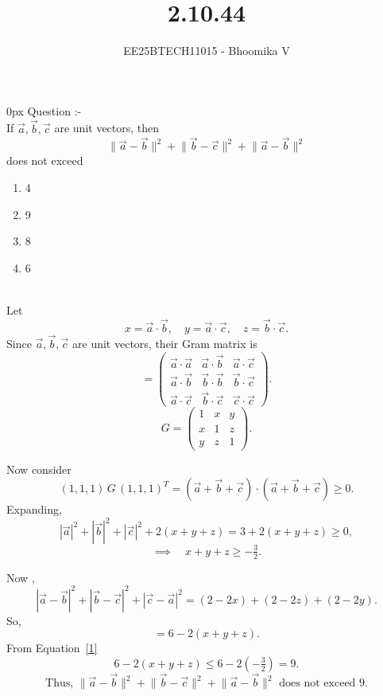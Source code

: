 \documentclass[journal]{IEEEtran}
\begin{document}

\vspace{3cm}

\title{2.10.44}
\author{EE25BTECH11015 - Bhoomika V}
{\let\newpage\relax\maketitle}

\renewcommand{\thefigure}{\theenumi}
\renewcommand{\thetable}{\theenumi}
\setlength{\intextsep}{10pt} %


\renewcommand{\thetable}{\theenumi}
\parindent 0px 
{Question :-} \\ 
If $\vec{a}, \vec{b}, \vec{c}$ are unit vectors, then
\[
\lVert \vec{a} - \vec{b} \rVert^2
+ \lVert \vec{b} - \vec{c} \rVert^2
+ \lVert \vec{a} - \vec{b} \rVert^2
\]
does not exceed
\begin{enumerate}[label=\alph*)] %
    \item 4
    \item 9
    \item 8
    \item 6
\end{enumerate}




\solution \\
Let 
\[
x = \vec{a}\cdot \vec{b}, \quad y = \vec{a}\cdot \vec{c}, \quad z = \vec{b}\cdot \vec{c}.
\]
Since $\vec{a},\vec{b},\vec{c}$ are unit vectors, their Gram matrix is
\[
 = \begin{pmatrix}
\vec{a}\cdot \vec{a} & \vec{a}\cdot \vec{b} & \vec{a}\cdot \vec{c} \\
\vec{a}\cdot \vec{b} & \vec{b}\cdot \vec{b} & \vec{b}\cdot \vec{c} \\
\vec{a}\cdot \vec{c} & \vec{b}\cdot \vec{c} & \vec{c}\cdot \vec{c}
\end{pmatrix}.
\]
\[
G = \begin{pmatrix}
1 & x & y \\
x & 1 & z \\
y & z & 1
\end{pmatrix}.
\]

Now consider
\[
(1,1,1) \, G \, (1,1,1)^T = (\vec{a}+\vec{b}+\vec{c}) \cdot (\vec{a}+\vec{b}+\vec{c}) \geq 0.
\]
Expanding,
\[
|\vec{a}|^2 + |\vec{b}|^2 + |\vec{c}|^2 + 2(x+y+z) = 3 + 2(x+y+z) \geq 0,
\]
\begin{equation}
\implies \quad x+y+z \geq -\tfrac{3}{2}.
\label{1}
\end{equation}




Now ,
\[
|\vec{a}-\vec{b}|^2 + |\vec{b}-\vec{c}|^2 + |\vec{c}-\vec{a}|^2
= (2-2x) + (2-2z) + (2-2y).
\]
So,
\[
= 6 - 2(x+y+z).
\]
From Equation~\eqref{1}
\[
6 - 2(x+y+z) \leq 6 - 2\left(-\tfrac{3}{2}\right) = 9.
\]
\[
\text{Thus, } 
\lVert \vec{a} - \vec{b} \rVert^2
+ \lVert \vec{b} - \vec{c} \rVert^2
+ \lVert \vec{a} - \vec{b} \rVert^2
\text{ does not exceed } 9.
\]
\end{document}
